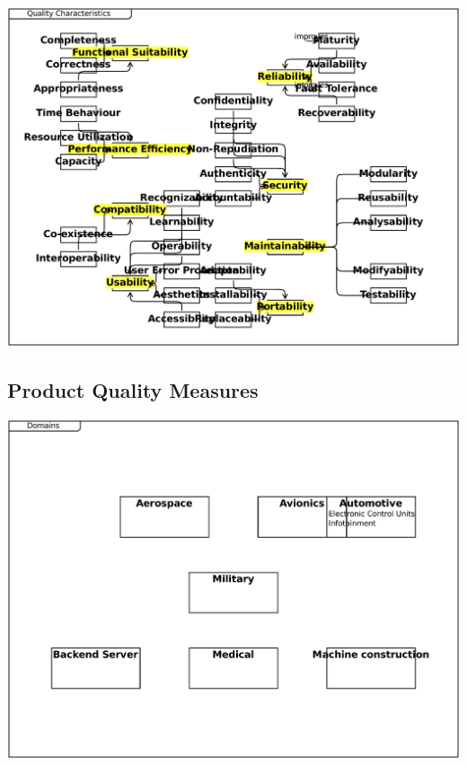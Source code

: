 \documentclass{article}
\begin{document}
\includegraphics[width= 1.0\linewidth]{quality_export/4_Quality_Characteristics.pdf}
\begin{alltt}

\end{alltt}

\subsection{Product Quality Measures}

\includegraphics[width= 1.0\linewidth]{quality_export/5_Domains.pdf}
\begin{alltt}

\end{alltt}
\end{document}
